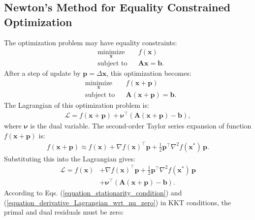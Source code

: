 \documentclass[lang=cn,10pt]{gorgeousnbook}
\numberwithin{equation}{section}%
\numberwithin{figure}{section}%
\begin{document}
\subsection{Newton's Method for Equality Constrained Optimization}

The optimization problem may have equality constraints:
\begin{equation}\label{equation_optimization_problem_equality_constraint}
\begin{aligned}
& \underset{\boldsymbol{x}}{\text{minimize}}
& & f(\boldsymbol{x}) \\
& \text{subject to}
& & \boldsymbol{A} \boldsymbol{x} = \boldsymbol{b}.
\end{aligned}
\end{equation}
After a step of update by $\boldsymbol{p} = \Delta \boldsymbol{x}$, this optimization becomes:
\begin{equation}
\begin{aligned}
& \underset{\boldsymbol{x}}{\text{minimize}}
& & f(\boldsymbol{x} + \boldsymbol{p}) \\
& \text{subject to}
& & \boldsymbol{A} (\boldsymbol{x} + \boldsymbol{p}) = \boldsymbol{b}.
\end{aligned}
\end{equation}
The Lagrangian of this optimization problem is:
\begin{align*}
\mathcal{L} = f(\boldsymbol{x} + \boldsymbol{p}) + \boldsymbol{\nu}^\top (\boldsymbol{A} (\boldsymbol{x} + \boldsymbol{p}) - \boldsymbol{b}),
\end{align*}
where $\boldsymbol{\nu}$ is the dual variable. 
The second-order Taylor series expansion of function $f(\boldsymbol{x} + \boldsymbol{p})$ is:
\begin{align}
f(\boldsymbol{x} + \boldsymbol{p}) \approx f(\boldsymbol{x}) + \nabla f(\boldsymbol{x})^\top \boldsymbol{p} + \frac{1}{2} \boldsymbol{p}^\top \nabla^2 f(\boldsymbol{x}^*)\, \boldsymbol{p}.
\end{align}
Substituting this into the Lagrangian gives:
\begin{align*}
\mathcal{L} = f(\boldsymbol{x}) &+ \nabla f(\boldsymbol{x})^\top \boldsymbol{p} + \frac{1}{2} \boldsymbol{p}^\top \nabla^2 f(\boldsymbol{x}^*)\, \boldsymbol{p} \\
&+ \boldsymbol{\nu}^\top (\boldsymbol{A} (\boldsymbol{x} + \boldsymbol{p}) - \boldsymbol{b}).
\end{align*}
According to Eqs. (\ref{equation_stationarity_condition}) and (\ref{equation_derivative_Lagrangian_wrt_nu_zero}) in KKT conditions, the primal and dual residuals must be zero:
\end{document}
